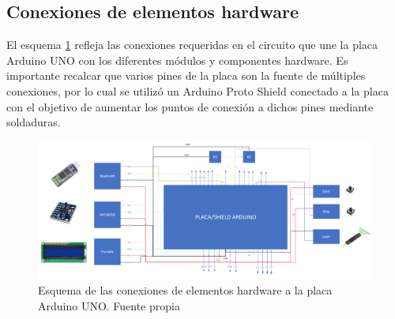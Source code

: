 \subsection{Conexiones de elementos hardware}
El esquema \ref{fig:circuito} refleja las conexiones requeridas en el circuito que une la placa Arduino UNO con los diferentes módulos y componentes hardware. Es importante recalcar que varios pines de la placa son la fuente de múltiples conexiones, por lo cual se utilizó un Arduino Proto Shield conectado a la placa con el objetivo de aumentar los puntos de conexión a dichos pines mediante soldaduras.
\begin{figure}
    \centering
    \includegraphics[width=1\textwidth]{img/circuito.png}
    \caption{Esquema de las conexiones de elementos hardware a la placa Arduino UNO. Fuente propia}
    \label{fig:circuito}
\end{figure}

